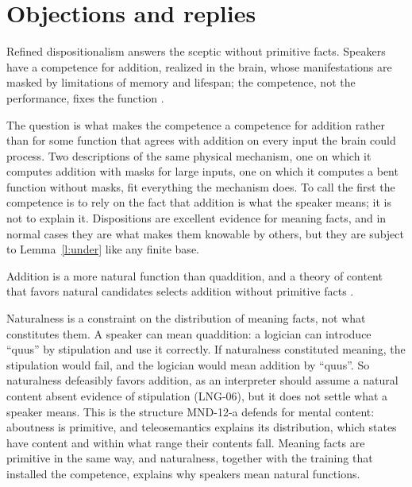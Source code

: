 \documentclass{situationist-preprint}
\begin{document}
\section{Objections and replies}

\begin{objection}
Refined dispositionalism answers the sceptic without primitive facts. Speakers have a competence for addition, realized in the brain, whose manifestations are masked by limitations of memory and lifespan; the competence, not the performance, fixes the function \citep{MartinHeil1998}.
\end{objection}

\begin{reply}
The question is what makes the competence a competence for addition rather than for some function that agrees with addition on every input the brain could process. Two descriptions of the same physical mechanism, one on which it computes addition with masks for large inputs, one on which it computes a bent function without masks, fit everything the mechanism does. To call the first the competence is to rely on the fact that addition is what the speaker means; it is not to explain it. Dispositions are excellent evidence for meaning facts, and in normal cases they are what makes them knowable by others, but they are subject to Lemma~\ref{l:under} like any finite base.
\end{reply}

\begin{objection}[Naturalness]
Addition is a more natural function than quaddition, and a theory of content that favors natural candidates selects addition without primitive facts \citep{Lewis1983}.
\end{objection}

\begin{reply}
Naturalness is a constraint on the distribution of meaning facts, not what constitutes them. A speaker can mean quaddition: a logician can introduce \enquote{quus} by stipulation and use it correctly. If naturalness constituted meaning, the stipulation would fail, and the logician would mean addition by \enquote{quus}. So naturalness defeasibly favors addition, as an interpreter should assume a natural content absent evidence of stipulation (LNG-06), but it does not settle what a speaker means. This is the structure MND-12-a defends for mental content: aboutness is primitive, and teleosemantics explains its distribution, which states have content and within what range their contents fall. Meaning facts are primitive in the same way, and naturalness, together with the training that installed the competence, explains why speakers mean natural functions.
\end{reply}
\end{document}
